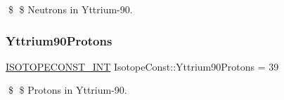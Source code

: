 \$ \$ Neutrons in Yttrium-\/90. \mbox{\label{group___isotope_const-_yttrium-_y90_gaca3d9a5749d049b3c27460e5a33dac44}} 
\subsubsection{\texorpdfstring{Yttrium90\+Protons}{Yttrium90Protons}}
{\footnotesize\ttfamily \mbox{\hyperlink{group___isotope_const-_macros_ga5f18360b3e99483a35c32d789e62621c}{I\+S\+O\+T\+O\+P\+E\+C\+O\+N\+S\+T\+\_\+\+I\+NT}} Isotope\+Const\+::\+Yttrium90\+Protons = 39}

\$ \$ Protons in Yttrium-\/90. 